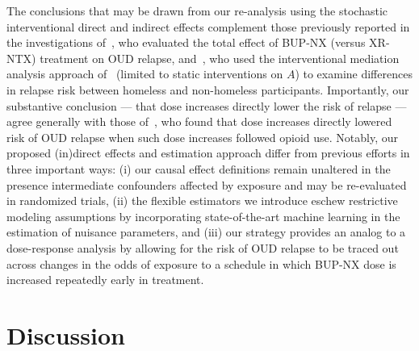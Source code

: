 The conclusions that may be drawn from our re-analysis using the stochastic
interventional direct and indirect effects complement those previously reported
in the investigations of~\citet{lee2018comparative}, who evaluated the total
effect of BUP-NX (versus XR-NTX) treatment on OUD relapse,
and~\citet{rudolph2020explaining}, who used the interventional mediation
analysis approach of~\citet{diaz2020nonparametric} (limited to static
interventions on $A$) to examine differences in relapse risk between homeless
and non-homeless participants. Importantly, our substantive conclusion --- that
dose increases directly lower the risk of relapse --- agree generally with those
of~\citet{rudolph2020association}, who found that dose increases directly
lowered risk of OUD relapse when such dose increases followed opioid use.
Notably, our proposed (in)direct effects and estimation approach differ from
previous efforts in three important ways: (i) our causal effect definitions
remain unaltered in the presence intermediate confounders affected by exposure
and may be re-evaluated in randomized trials, (ii) the flexible estimators we
introduce eschew restrictive modeling assumptions by incorporating
state-of-the-art machine learning in the estimation of nuisance parameters, and
(iii) our strategy provides an analog to a dose-response analysis by allowing
for the risk of OUD relapse to be traced out across changes in the odds of
exposure to a schedule in which BUP-NX dose is increased repeatedly early in
treatment.

\section{Discussion}\label{sec:discuss}


